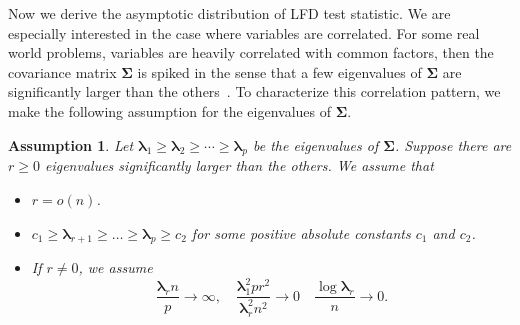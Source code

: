 \documentclass[12pt]{article} %
\newcommand{\bfsym}[1]{\ensuremath{\boldsymbol{#1}}}
\def\blambda {\bfsym {\lambda}}
\def\bSigma {\bfsym {\Sigma}}
\newtheorem{assumption}{Assumption}
\theoremstyle{definition}
\begin{document}
Now we derive the asymptotic distribution of LFD test statistic.
We are especially interested in the case where variables are correlated.
For some real world problems, variables are heavily correlated with common factors, then the covariance matrix $\bSigma$ is spiked in the sense that a few eigenvalues of $\bSigma$ are significantly larger than the others~\citep{Fan2008High,Cai2012Sparse,Shen2013Consistency,Ma2015A}.
To characterize this correlation pattern, we make the following assumption for the eigenvalues of $\bSigma$.




\begin{assumption}\label{assumpEigen}
    Let $\blambda_1\geq \blambda_2\geq \cdots \geq \blambda_p$ be the eigenvalues of $\bSigma$.
    Suppose there are $r\geq 0$ eigenvalues significantly larger than the others.
    We assume that
    \begin{itemize}
        \item
     $r=o(n)$.
\item
 $c_1 \geq \blambda_{r+1} \geq \ldots \geq \blambda_{p} \geq c_2$ for some positive absolute constants $c_1$ and $c_2$.
            \item
    If $r\neq 0$, we assume 
    $$\frac{\blambda_r n}{p}\to \infty,\quad
    \frac{\blambda_1^2 pr^2}{\blambda_r^2 n^2}\to 0\quad
        \frac{\log \blambda_r}{n}\to 0.$$
    \end{itemize}
\end{assumption}
\end{document}

